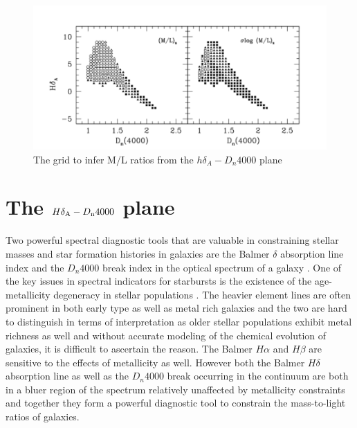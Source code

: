 \begin{figure}
\includegraphics[width=\textwidth]{figures/Kauffmann_grid}
\caption[The \citet{kauffmann_stellar_2003} grid to infer M/L ratios from the $h\delta_{A}-D_{n}4000$ plane]
{The \citet{kauffmann_stellar_2003} grid to infer M/L ratios from the $h\delta_{A}-D_{n}4000$ plane
\label{fig:kauff_grid}}
\end{figure}

\section{The $H\delta_{\rm A}-D_{\rm n}4000$ plane}

Two powerful spectral diagnostic tools that are valuable in constraining stellar masses and star formation histories in galaxies are the Balmer $\delta$ absorption line index and the $D_{n}4000$ break index in the optical spectrum of a galaxy \citep{kauffmann_stellar_2003}. One of the key issues in spectral indicators for starbursts is the existence of the age-metallicity degeneracy in stellar populations \citep{worthey_comprehensive_1994}. The heavier element lines are often prominent in both early type as well as metal rich galaxies and the two are hard to distinguish in terms of interpretation as older stellar populations exhibit metal richness as well and without accurate modeling of the chemical evolution of galaxies, it is difficult to ascertain the reason. The Balmer $H\alpha$ and $H\beta$ are sensitive to the effects of metallicity as well. However both the Balmer $H\delta$ absorption line as well as the $D_{n}4000$ break occurring in the continuum are both in a bluer region of the spectrum relatively unaffected by metallicity constraints and together they form a powerful diagnostic tool to constrain the mass-to-light ratios of galaxies. 


